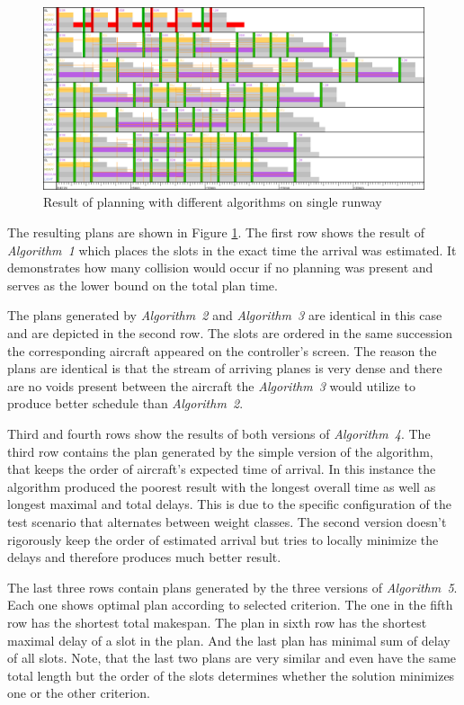 \begin{figure}[h]
    \centering
    \includegraphics[width=\textwidth]{figures/1rwy-alternating.png}
    \caption{Result of planning with different algorithms on single runway}
    \label{fig:1rwy-alternating}
\end{figure}

The resulting plans are shown in Figure \ref{fig:1rwy-alternating}. The first row shows the result of {\em Algorithm~1} which places the slots in the exact time the arrival was estimated. It demonstrates how many collision would occur if no planning was present and serves as the lower bound on the total plan time.

The plans generated by {\em Algorithm~2} and {\em Algorithm~3} are identical in this case and are depicted in the second row. The slots are ordered in the same succession the corresponding aircraft appeared on the controller's screen. The reason the plans are identical is that the stream of arriving planes is very dense and there are no voids present between the aircraft the {\em Algorithm~3} would utilize to produce better schedule than {\em Algorithm~2}.

Third and fourth rows show the results of both versions of {\em Algorithm~4}. The third row contains the plan generated by the simple version of the algorithm, that keeps the order of aircraft's expected time of arrival. In this instance the algorithm produced the poorest result with the longest overall time as well as longest maximal and total delays. This is due to the specific configuration of the test scenario that alternates between weight classes. The second version doesn't rigorously keep the order of estimated arrival but tries to locally minimize the delays and therefore produces much better result.

The last three rows contain plans generated by the three versions of {\em Algorithm~5}. Each one shows optimal plan according to selected criterion. The one in the fifth row has the shortest total makespan. The plan in sixth row has the shortest maximal delay of a slot in the plan. And the last plan has minimal sum of delay of all slots. Note, that the last two plans are very similar and even have the same total length but the order of the slots determines whether the solution minimizes one or the other criterion.

